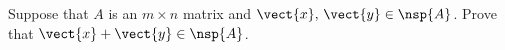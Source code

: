 Suppose that $A$ is an $m\times n$ matrix and $\vect{x},\,\vect{y}\in\nsp{A}$.  Prove that $\vect{x}+\vect{y}\in\nsp{A}$.
